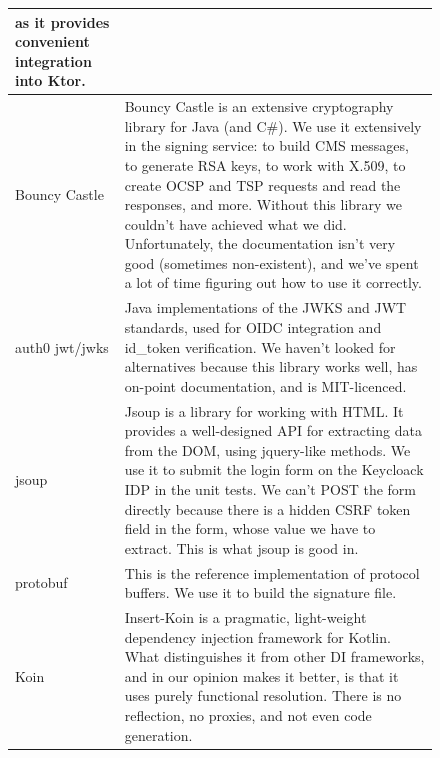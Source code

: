 \begin{figure}
\begin{center}
\begin{tabular}{p{3cm}|p{12cm}}
            as it provides convenient integration into Ktor.
            \\ \hline
            Bouncy Castle &
            Bouncy Castle is an extensive cryptography library for Java (and C\#).
            We use it extensively in the signing service:
            to build \gls{CMS} messages,
            to generate \gls{RSA} keys,
            to work with X.509,
            to create \gls{OCSP} and \gls{TSP} requests and read the responses,
            and more.
            Without this library we couldn't have achieved what we did.
            Unfortunately, the documentation isn't very good (sometimes non-existent),
            and we've spent a lot of time figuring out how to use it correctly.
            \\ \hline
            auth0 jwt/jwks &
            Java implementations of the \gls{JWKS} and \gls{JWT} standards,
            used for \gls{OIDC} integration and id\_token verification.
            We haven't looked for alternatives because this library works well,
            has on-point documentation, and is MIT-licenced.
            \\ \hline
            jsoup &
            Jsoup is a library for working with \gls{HTML}.
            It provides a well-designed \gls{API} for extracting data from the \gls{DOM},
            using jquery-like methods.
            We use it to submit the login form on the Keycloack \gls{IDP} in the unit tests.
            We can't POST the form directly because there is a hidden \gls{CSRF} token field in the form,
            whose value we have to extract.
            This is what jsoup is good in.
            \\ \hline
            protobuf &
            This is the reference implementation of protocol buffers.
            We use it to build the signature file.
            \\ \hline
            Koin &
            Insert-Koin is a pragmatic, light-weight dependency injection framework for Kotlin.
            What distinguishes it from other \gls{DI} frameworks,
            and in our opinion makes it better,
            is that it uses purely functional resolution.
            There is no reflection, no proxies, and not even code generation.
            \\
        \end{tabular}
    \end{center}
\end{figure}

